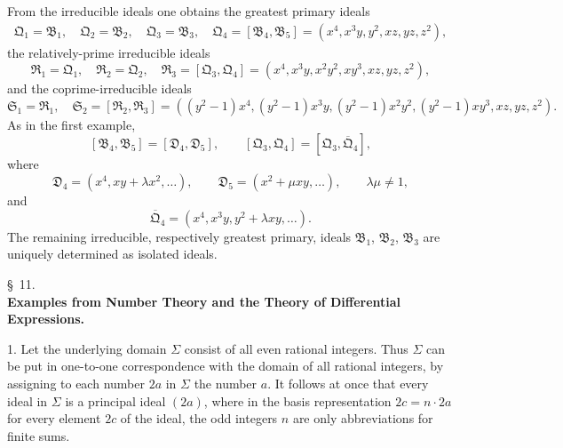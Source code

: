 \documentclass[11pt]{article}
\providecommand{\ideal}[1]{\mathfrak{#1}}
\begin{document}
From the irreducible ideals one obtains the greatest primary ideals
\[
\begin{gathered}
 \ideal Q_1=\ideal B_1,
 \quad \ideal Q_2=\ideal B_2,
 \quad \ideal Q_3=\ideal B_3,
 \quad \ideal Q_4=[\ideal B_4,\ideal B_5]=(x^4,x^3y,y^2,xz,yz,z^2),
\end{gathered}
\]
the relatively-prime irreducible ideals
\[
 \ideal R_1=\ideal Q_1,
 \quad \ideal R_2=\ideal Q_2,
 \quad
 \ideal R_3=[\ideal Q_3,\ideal Q_4]=(x^4,x^3y,x^2y^2,xy^3,xz,yz,z^2),
\]
and the coprime-irreducible ideals
\[
 \ideal S_1=\ideal R_1,
 \quad \ideal S_2=[\ideal R_2,\ideal R_3]
 =((y^2-1)x^4,(y^2-1)x^3y,(y^2-1)x^2y^2,
 (y^2-1)xy^3,xz,yz,z^2).
\]
As in the first example,
\[
 [\ideal B_4,\ideal B_5]=[\ideal D_4,\ideal D_5],
 \qquad
 [\ideal Q_3,\ideal Q_4]=[\ideal Q_3,
\overline{\ideal Q}_4],
\]
where
\[
 \ideal D_4=(x^4,xy+\lambda x^2,\ldots),
 \qquad
 \ideal D_5=(x^2+\mu xy,\ldots),
 \qquad \lambda\mu\ne1,
\]
and
\[
 \overline{\ideal Q}_4=(x^4,x^3y,y^2+\lambda xy,\ldots).
\]
The remaining irreducible, respectively greatest primary, ideals $\ideal B_1$, $\ideal B_2$, $\ideal B_3$ are uniquely determined as isolated ideals.

\begin{center}
\S~11.\\[0.25em]
\textbf{Examples from Number Theory and the Theory of Differential Expressions.}
\end{center}

1. Let the underlying domain $\Sigma$ consist of all even rational integers. Thus $\Sigma$ can be put in one-to-one correspondence with the domain of all rational integers, by assigning to each number $2a$ in $\Sigma$ the number $a$. It follows at once that every ideal in $\Sigma$ is a principal ideal $(2a)$, where in the basis representation $2c=n\cdot2a$ for every element $2c$ of the ideal, the odd integers $n$ are only abbreviations for finite sums.
\end{document}
